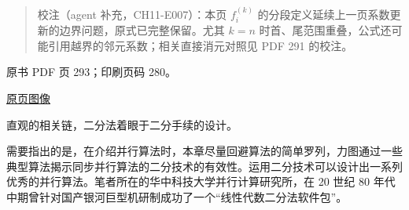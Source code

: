 \begin{quote}
校注（agent 补充，CH11-E007）：本页 \(f_i^{(k)}\) 的分段定义延续上一页系数更新的边界问题，原式已完整保留。尤其 \(k=n\) 时首、尾范围重叠，公式还可能引用越界的邻元系数；相关直接消元对照见 PDF 291 的校注。
\end{quote}

\clearpage

原书 PDF 页 293；印刷页码 280。

\href{source-images/pdf-293.jpeg}{原页图像}

直观的相关链，二分法着眼于二分手续的设计。

需要指出的是，在介绍并行算法时，本章尽量回避算法的简单罗列，力图通过一些典型算法揭示同步并行算法的二分技术的有效性。运用二分技术可以设计出一系列优秀的并行算法。笔者所在的华中科技大学并行计算研究所，在 20 世纪 80 年代中期曾针对国产银河巨型机研制成功了一个``线性代数二分法软件包''。

